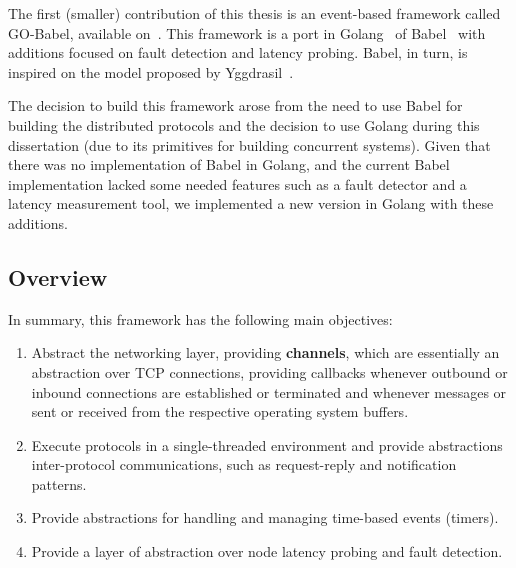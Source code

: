 
The first (smaller) contribution of this thesis is an event-based framework called GO-Babel, available on~\cite{goBabel}. This framework is a port in Golang~\cite{golang} of Babel~\cite{babel} with additions focused on fault detection and latency probing. Babel, in turn, is inspired on the model proposed by Yggdrasil~\cite{akosThesis}.

The decision to build this framework arose from the need to use Babel for building the distributed protocols and the decision to use Golang during this dissertation (due to its primitives for building concurrent systems). Given that there was no implementation of Babel in Golang, and the current Babel implementation lacked some needed features such as a fault detector and a latency measurement tool, we implemented a new version in Golang with these additions.

\subsection{Overview}

In summary, this framework has the following main objectives:

\begin{enumerate}

    \item Abstract the networking layer, providing \textbf{channels}, which are essentially an abstraction over TCP connections, providing callbacks whenever outbound or inbound connections are established or terminated and whenever messages or sent or received from the respective operating system buffers.

    \item Execute protocols in a single-threaded environment and provide abstractions inter-protocol communications, such as request-reply and notification patterns.
    
    \item Provide abstractions for handling and managing time-based events (timers).

    \item Provide a layer of abstraction over node latency probing and fault detection.

\end{enumerate}

